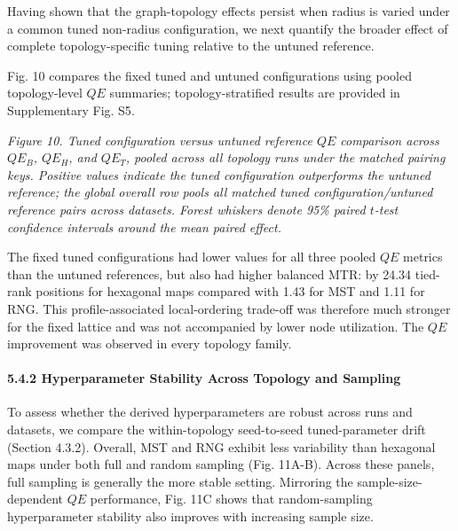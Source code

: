 \documentclass[
]{article}
\makeatletter
\newcommand*\pandocbounded[1]{%
  \sbox\pandoc@box{#1}%
  \Gscale@div\@tempa{\textheight}{\dimexpr\ht\pandoc@box+\dp\pandoc@box\relax}%
  \Gscale@div\@tempb{\linewidth}{\wd\pandoc@box}%
  \ifdim\@tempb\p@<\@tempa\p@\let\@tempa\@tempb\fi%
  \ifdim\@tempa\p@<\p@\scalebox{\@tempa}{\usebox\pandoc@box}%
  \else\usebox{\pandoc@box}%
  \fi%
}
\providecommand{\DIFadd}[1]{{\protect\color{blue} #1}} %
\providecommand{\DIFaddbegin}{} %
\providecommand{\DIFaddend}{} %
\makeatother
\begin{document}
 \DIFaddbegin \DIFadd{Having shown that the graph-topology effects persist when radius is
varied under a common tuned non-radius configuration, we next quantify
the broader effect of complete topology-specific tuning relative to the
untuned reference.
}

\DIFadd{Fig. 10 compares the fixed tuned and untuned configurations using pooled
}\DIFaddend topology-level \(QE\)  \DIFaddbegin \DIFadd{summaries; topology-stratified results are
provided in Supplementary Fig. S5}\DIFaddend .

 \DIFaddbegin \pandocbounded{}
\DIFadd{\emph{Figure 10. Tuned configuration versus untuned reference \(QE\)
comparison across \(QE_B\), \(QE_H\), and \(QE_T\), pooled across all
topology runs under the matched pairing keys. Positive values indicate
the tuned configuration outperforms the untuned reference; the global
overall row pools all matched tuned configuration/untuned reference
pairs across datasets. Forest whiskers denote 95\% paired \(t\)-test
confidence intervals around the mean paired effect.}
}\DIFaddend

 \DIFaddbegin \DIFadd{The fixed tuned configurations had lower values }\DIFaddend for all three  \DIFaddbegin \DIFadd{pooled
\(QE\) metrics than the untuned references, but also had higher balanced
MTR: by 24.34 tied-rank positions for hexagonal maps compared with 1.43
for MST and 1.11 for RNG. This profile-associated local-ordering
trade-off was therefore much stronger for the fixed lattice and was not
accompanied by lower node utilization. The \(QE\) improvement was
observed in every topology family}\DIFaddend .

\paragraph{5.4.2 Hyperparameter Stability Across Topology and
Sampling}\label{hyperparameter-stability-across-topology-and-sampling}

To assess whether the derived hyperparameters are robust across runs and
datasets, we compare the within-topology seed-to-seed tuned-parameter
drift (Section 4.3.2). Overall, MST and RNG  \DIFaddbegin \DIFadd{exhibit less variability
than hexagonal maps under both full and random sampling (Fig. 11A-B}\DIFaddend ).
Across these panels, full sampling is generally the more stable setting.
Mirroring the sample-size-dependent \(QE\) performance, Fig.  \DIFaddbegin \DIFadd{11C shows
that random-sampling }\DIFaddend hyperparameter stability also improves with
increasing sample size.
\end{document}

